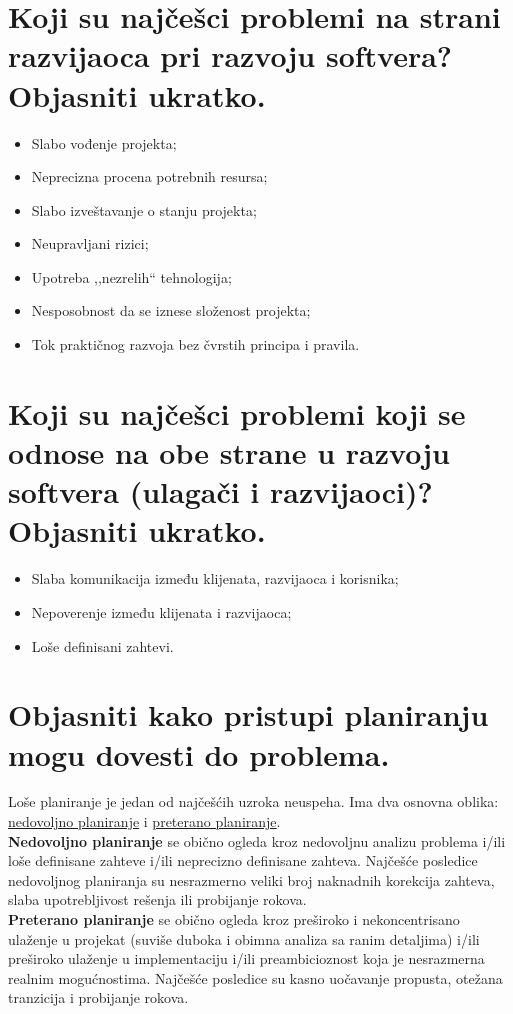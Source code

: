 \documentclass[a4paper]{article}
\begin{document}
\section{Koji su najčešci problemi na strani razvijaoca pri razvoju softvera? Objasniti ukratko.}
    \begin{itemize}
      \item Slabo vođenje projekta;
      \item Neprecizna procena potrebnih resursa;
      \item Slabo izveštavanje o stanju projekta;
      \item Neupravljani rizici;
      \item Upotreba ,,nezrelih`` tehnologija;
      \item Nesposobnost da se iznese složenost projekta;
      \item Tok praktičnog razvoja bez čvrstih principa i pravila.
    \end{itemize}

\section{Koji su najčešci problemi koji se odnose na obe strane u razvoju softvera 
         (ulagači i razvijaoci)? Objasniti ukratko.}
    \begin{itemize}
      \item Slaba komunikacija između klijenata, razvijaoca i korisnika;
      \item Nepoverenje između klijenata i razvijaoca;
      \item Loše definisani zahtevi.
    \end{itemize}

\section{Objasniti kako pristupi planiranju mogu dovesti do problema.}
    Loše planiranje je jedan od najčešćih uzroka neuspeha. Ima dva osnovna oblika:
    \underline{nedovoljno planiranje} i \underline{preterano planiranje}.\\
    \indent \textbf{Nedovoljno planiranje} se obično ogleda kroz nedovoljnu analizu problema
    i/ili loše definisane zahteve i/ili neprecizno definisane zahteva. Najčešće posledice
    nedovoljnog planiranja su nesrazmerno veliki broj naknadnih korekcija zahteva,
    slaba upotrebljivost rešenja ili probijanje rokova.\\
    \indent \textbf{Preterano planiranje} se obično ogleda kroz preširoko i nekoncentrisano ulaženje 
    u projekat (suviše duboka i obimna analiza sa ranim detaljima) 
    i/ili preširoko ulaženje u implementaciju
    i/ili preambicioznost koja je nesrazmerna realnim mogućnostima. Najčešće posledice su
    kasno uočavanje propusta, otežana tranzicija i probijanje rokova. 
\end{document}
